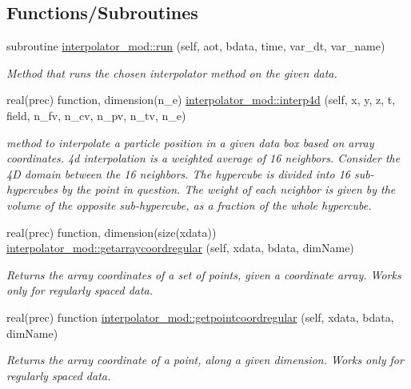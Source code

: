 \subsection*{Functions/\+Subroutines}
\begin{DoxyCompactItemize}
\item 
subroutine \mbox{\hyperlink{namespaceinterpolator__mod_a1c98c171b308ef58850102f67abcca95}{interpolator\+\_\+mod\+::run}} (self, aot, bdata, time, var\+\_\+dt, var\+\_\+name)
\begin{DoxyCompactList}\small\item\em Method that runs the chosen interpolator method on the given data. \end{DoxyCompactList}\item 
real(prec) function, dimension(n\+\_\+e) \mbox{\hyperlink{namespaceinterpolator__mod_ac54a92d43721099e8e5bc5a888d7ee73}{interpolator\+\_\+mod\+::interp4d}} (self, x, y, z, t, field, n\+\_\+fv, n\+\_\+cv, n\+\_\+pv, n\+\_\+tv, n\+\_\+e)
\begin{DoxyCompactList}\small\item\em method to interpolate a particle position in a given data box based on array coordinates. 4d interpolation is a weighted average of 16 neighbors. Consider the 4D domain between the 16 neighbors. The hypercube is divided into 16 sub-\/hypercubes by the point in question. The weight of each neighbor is given by the volume of the opposite sub-\/hypercube, as a fraction of the whole hypercube. \end{DoxyCompactList}\item 
real(prec) function, dimension(size(xdata)) \mbox{\hyperlink{namespaceinterpolator__mod_a6aca35ff7ad8ecb7c741c51f1863a30d}{interpolator\+\_\+mod\+::getarraycoordregular}} (self, xdata, bdata, dim\+Name)
\begin{DoxyCompactList}\small\item\em Returns the array coordinates of a set of points, given a coordinate array. Works only for regularly spaced data. \end{DoxyCompactList}\item 
real(prec) function \mbox{\hyperlink{namespaceinterpolator__mod_aeb34e8a46a439ed5ca9115c405b225f1}{interpolator\+\_\+mod\+::getpointcoordregular}} (self, xdata, bdata, dim\+Name)
\begin{DoxyCompactList}\small\item\em Returns the array coordinate of a point, along a given dimension. Works only for regularly spaced data. \end{DoxyCompactList}\item 

\end{DoxyCompactItemize}
